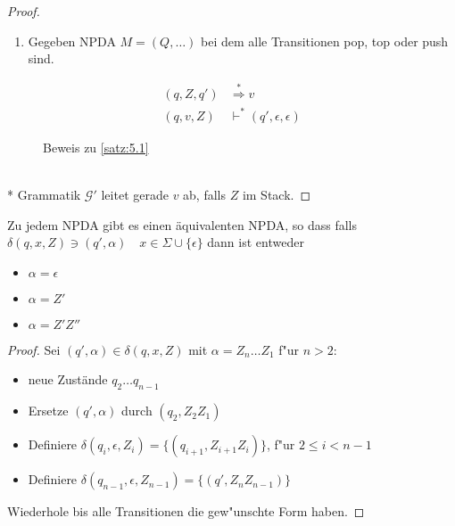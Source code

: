 \begin{proof}
\begin{itemize}
\begin{description}
\begin{enumerate}
\begin{align*}
					B_2 &\overset{*}{\==>} v_2 \text{ \ruleplaceholder{\widthof{mit kleinerem Abeitungsbaum}}}\\
					(q,v_1v_2,A) &\vdash (q,v_1v_2,B_1B_2)\\
					&\vdash^* (q,v_2,B_2) \quad \text{nach I.V. für }B_1\\
					&\vdash^* (q,\epsilon,\epsilon) \quad \text{nach I.V. für }B_2\\
					\text{D.h. } S\overset{*}{\==>} w &\<==> (q,w,S) \vdash^* (q,\epsilon,\epsilon)\\
					&\<==> w\in L(M)
				\end{align*}
			\item["'\<="'] Gegeben \ac{NPDA} $M=(Q,\dots)$ bei dem alle Transitionen pop, top oder push sind.
			\end{enumerate}
		\end{description}
	\end{itemize}
	\begin{figure}[H]\centering\vspace{-1em}
		
		{\setlength{\belowdisplayskip}{-.5em}
		\begin{align*}
			(q,Z,q') &\overset{*}{\Rightarrow} v\\
			(q,v,Z) &\vdash^* (q',\epsilon,\epsilon)
		\end{align*}}
		\caption{Beweis zu \autoref{satz:5.1}}
	\end{figure}\vspace{-2.5em}\qedhere\\*
    Grammatik $\mathcal{G}'$ leitet gerade $v$ ab, falls $Z$ im Stack.
\end{proof}

\begin{lemma}
	Zu jedem \ac{NPDA} gibt es einen äquivalenten \ac{NPDA}, so dass
	falls $\delta(q,x,Z)\ni (q',\alpha) \quad x\in\Sigma\cup\{\epsilon\}$
	dann ist entweder
	\begin{itemize}
		\item $\alpha = \epsilon$
		\item $\alpha = Z'$
		\item $\alpha = Z'Z''$
	\end{itemize}
	\vspace{-1.5em}
\end{lemma}
\begin{proof}
	Sei $(q',\alpha)\in\delta(q,x,Z)$ mit $\alpha = Z_n\dots Z_1$ f"ur $n>2$:
	\begin{itemize}
	\item 	neue Zustände $q_2\dots q_{n-1}$
	\item Ersetze $(q',\alpha)$ durch $(q_2, Z_2Z_1)$
	\item Definiere $\delta(q_i, \epsilon, Z_i) = \{ (q_{i+1}, Z_{i+1}Z_i) \}$, f"ur $2\le i < n-1$
	\item Definiere $\delta(q_{n-1}, \epsilon, Z_{n-1}) = \{ (q', Z_nZ_{n-1}) \}$
	\end{itemize}
	Wiederhole bis alle Transitionen die gew"unschte Form haben. \qedhere
\end{proof}

